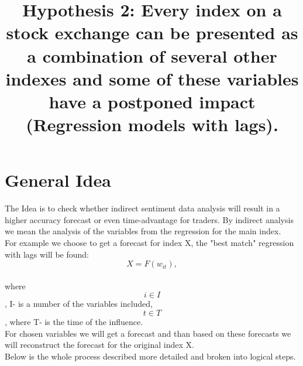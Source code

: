 \documentclass{article}
\title{Hypothesis 2: Every index on a stock exchange can be presented as a combination of several other indexes and some of these variables have a postponed impact (Regression models with lags).}
\begin{document}
\maketitle

\section{General Idea}
The Idea is to check whether indirect sentiment data analysis will result in a higher accuracy forecast or even time-advantage for traders. By indirect analysis we mean the analysis of the variables from the regression for the main index.\\
For example we choose to get a forecast for index X, the "best match" regression with lags will be found:\\
\[X = F(w_{it}),\]\\
where \[i\in I\], I- is a number of the variables included,\\
\[t \in T\], where T- is the time of the influence.\\
For chosen variables we will get a forecast and than based on these forecasts we will reconstruct the forecast for the original index X.\\
Below is the whole process described more detailed and broken into logical steps.
\end{document}
